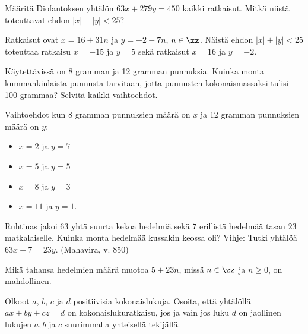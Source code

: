 \begin{tehtava}
    Määritä Diofantoksen yhtälön $63x + 279y = 450$ kaikki ratkaisut. Mitkä niistä toteuttavat ehdon $|x| + |y| < 25$?
    
    \begin{vastaus}
        Ratkaisut ovat $x = 16 + 31n$ ja $y = -2 - 7n$, $n\in\zz$. Näistä ehdon $|x| + |y| < 25$ toteuttaa ratkaisu $x = -15$ ja $y = 5$ sekä ratkaisut $x = 16$ ja $y = -2$.
    \end{vastaus}
    
\end{tehtava}

\begin{tehtava}
    Käytettävissä on 8 gramman ja 12 gramman punnuksia. Kuinka monta kummankinlaista punnusta tarvitaan, jotta punnusten kokonaismassaksi tulisi 100 grammaa? Selvitä kaikki vaihtoehdot.
    
    \begin{vastaus}
        Vaihtoehdot kun 8 gramman punnuksien määrä on $x$ ja 12 gramman punnuksien määrä on $y$:
        \begin{itemize}
            \item $x = 2$ ja $y = 7$
            \item $x = 5$ ja $y = 5$
            \item $x = 8$ ja $y = 3$
            \item $x = 11$ ja $y = 1$.
        \end{itemize}
    \end{vastaus}
    
\end{tehtava}

\begin{tehtava}
    Ruhtinas jakoi $63$ yhtä suurta kekoa hedelmiä sekä $7$ erillistä hedelmää tasan $23$ matkalaiselle. Kuinka monta hedelmää kussakin keossa oli? Vihje: Tutki yhtälöä $63x + 7 = 23y$. (Mahavira, v. 850)
    
    \begin{vastaus}
        Mikä tahansa hedelmien määrä muotoa $5 + 23n$, missä $n\in\zz$ ja $n\geq 0$, on mahdollinen.
    \end{vastaus}
    
\end{tehtava}

\begin{tehtava}
    Olkoot $a$, $b$, $c$ ja $d$ positiivisia kokonaislukuja. Osoita, että yhtälöllä $ax+by+cz=d$ on kokonaislukuratkaisu, jos ja vain jos luku $d$ on jaollinen lukujen $a, b$ ja $c$ suurimmalla yhteisellä tekijällä.
\end{tehtava}


